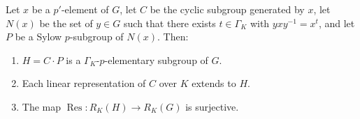 Let $x$ be a $p'$-element of $G$, let $C$ be the cyclic subgroup generated by $x$, let $N(x)$ be the set of $y \in G$ such that there exists $t \in \Gamma_K$ with $yxy^{-1} = x^t$, and let $P$ be a Sylow $p$-subgroup of $N(x)$. Then:

\begin{enumerate}
\item[(a)] $H = C \cdot P$ is a $\Gamma_K$-$p$-elementary subgroup of $G$.
\item[(b)] Each linear representation of $C$ over $K$ extends to $H$.
\item[(c)] The map $\operatorname{Res}: R_K(H) \to R_K(G)$ is surjective.
\end{enumerate}
